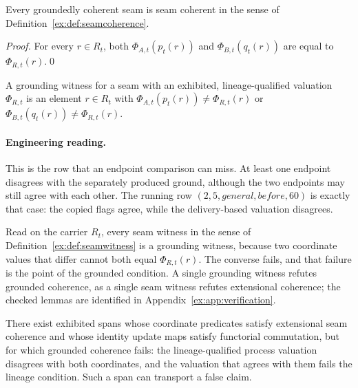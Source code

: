 \documentclass[smallextended,envcountsect,envcountsame,natbib]{svjour3}
\begin{document}
\begin{proposition}\label{ex:prop:grounding-entails-coherence}
Every groundedly coherent seam is seam coherent in the sense of Definition~\ref{ex:def:seamcoherence}.
\end{proposition}

\begin{proof}
For every $r\in R_t$, both
$\Phi_{A,t}(p_t(r))$ and
$\Phi_{B,t}(q_t(r))$ are equal to
$\Phi_{R,t}(r)$.\qed
\end{proof}

\begin{definition}\label{ex:def:grounding-witness}
A grounding witness for a seam with an exhibited, lineage-qualified valuation $\Phi_{R,t}$ is an element $r\in R_t$ with $\Phi_{A,t}(p_t(r))\neq\Phi_{R,t}(r)$ or $\Phi_{B,t}(q_t(r))\neq\Phi_{R,t}(r)$.
\end{definition}

\paragraph{Engineering reading.} This is the row that an endpoint comparison can miss. At least one endpoint disagrees with the separately produced ground, although the two endpoints may still agree with each other. The running row $(2,5,\mathit{general},\mathit{before},60)$ is exactly that case: the copied flags agree, while the delivery-based valuation disagrees.

Read on the carrier $R_t$, every seam witness in the sense of Definition~\ref{ex:def:seamwitness} is a grounding witness, because two coordinate values that differ cannot both equal $\Phi_{R,t}(r)$. The converse fails, and that failure is the point of the grounded condition. A single grounding witness refutes grounded coherence, as a single seam witness refutes extensional coherence; the checked lemmas are identified in Appendix~\ref{ex:app:verification}.

\begin{proposition}\label{ex:prop:ungrounded-agreement}
There exist exhibited spans whose coordinate predicates satisfy extensional seam coherence and whose identity update maps satisfy functorial commutation, but for which grounded coherence fails: the lineage-qualified process valuation disagrees with both coordinates, and the valuation that agrees with them fails the lineage condition. Such a span can transport a false claim.
\end{proposition}
\end{document}

